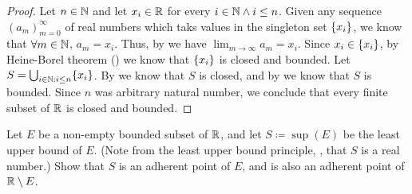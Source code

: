 \begin{proof}
  Let \(n \in \mathbb{N}\) and let \(x_i \in \mathbb{R}\) for every \(i \in \mathbb{N} \land i \leq n\).
  Given any sequence \((a_m)_{m = 0}^\infty\) of real numbers which taks values in the singleton set \(\left\lbrace x_i\right\rbrace\), we know that \(\forall m \in \mathbb{N}\), \(a_m = x_i\).
  Thus, by  we have \(\lim_{m \to \infty} a_m = x_i\).
  Since \(x_i \in \left\lbrace x_i\right\rbrace\), by Heine-Borel theorem () we know that \(\left\lbrace x_i\right\rbrace\) is closed and bounded.
  Let \(S = \bigcup_{i \in \N : i \leq n} \set{x_i}\).
  By  we know that \(S\) is closed, and by  we know that \(S\) is bounded.
  Since \(n\) was arbitrary natural number, we conclude that every finite subset of \(\mathbb{R}\) is closed and bounded.
\end{proof}

\begin{ex}\label{i:ex:9.1.15}
  Let \(E\) be a non-empty bounded subset of \(\mathbb{R}\), and let \(S \coloneqq \sup(E)\) be the least upper bound of \(E\).
  (Note from the least upper bound principle, , that \(S\) is a real number.)
  Show that \(S\) is an adherent point of \(E\), and is also an adherent point of \(\mathbb{R} \setminus E\).
\end{ex}

